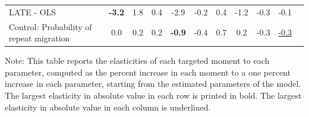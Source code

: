 \documentclass[12pt,pdftex]{article}
\begin{document}
\begin{table}[!h]
\begin{center}
\begin{tabular}{l c c c c c c c c c c}
LATE - OLS & \textbf{-3.2} & 1.8 & 0.4 & -2.9 & -0.2 & 0.4 & -1.2 & -0.3 & -0.1 \\

Control: Probability of repeat migration & 0.0 & 0.2 & 0.2 & \textbf{-0.9} & -0.4 & 0.7 & 0.2 & -0.3 & \underline{-0.3} \\

\hline \hline

\end{tabular}
\parbox[c]{6.6in}{%
{\footnotesize  \vspace{0.5cm} Note: This table reports the elasticities of each targeted moment to each parameter, computed as the percent increase in each moment to a one percent increase in each parameter, starting from the estimated parameters of the model. The largest elasticity in absolute value in each row is printed in bold. The largest elasticity in absolute value in each column is underlined.}
}
\end{center}
\end{table}


\end{document}
